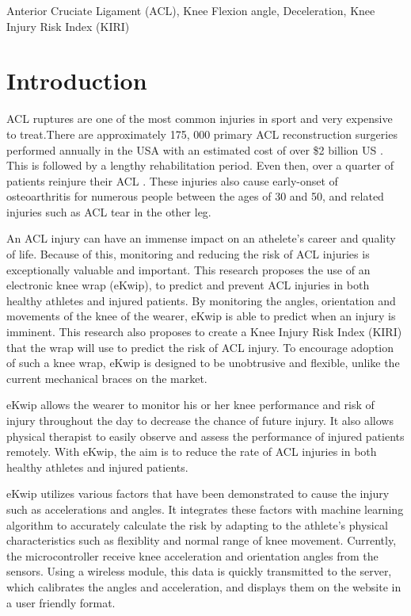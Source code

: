 \documentclass{sig-alternate}
\begin{document}
\begin{keywords}
	Anterior Cruciate Ligament (ACL),  Knee Flexion angle, Deceleration, Knee Injury Risk Index (KIRI)
\end{keywords}

\section{Introduction}
\label{sec:intro}
ACL ruptures are one of the most common injuries in sport and very expensive to treat.There are approximately 175, 000 primary ACL reconstruction surgeries performed annually in the USA with an estimated cost of over \$2 billion US \cite{yu2007mechanisms}. This is followed by a lengthy rehabilitation period. Even then, over a quarter of patients reinjure their ACL \cite{stevenson1998gender}. These injuries also cause early-onset of osteoarthritis for numerous people between the ages of 30 and 50, and related injuries such as ACL tear in the other leg. \cite{2d7e8810e30d11dd990c000ea68e967b}

An ACL injury can have an immense impact on an athelete's career and quality of life. Because of this, monitoring and reducing the risk of ACL injuries is exceptionally valuable and important. This research proposes the use of an electronic knee wrap (eKwip), to predict and prevent ACL injuries in both healthy athletes and injured patients. By monitoring the angles, orientation and movements of the knee of the wearer, eKwip is able to predict when an injury is imminent. This research also proposes to create a Knee Injury Risk Index (KIRI) that the wrap will use to predict the risk of ACL injury. To encourage adoption of such a knee wrap, eKwip is designed to be unobtrusive and flexible, unlike the current mechanical braces on the market.

eKwip allows the wearer to monitor his or her knee performance and risk of injury throughout the day to decrease the chance of future injury. It also allows physical therapist to easily observe and assess the performance of injured patients remotely. With eKwip, the aim is to reduce the rate of ACL injuries in both healthy athletes and injured patients.

eKwip utilizes various factors that have been demonstrated to cause the injury such as accelerations and angles. It integrates these factors with machine learning algorithm to accurately calculate the risk by adapting to the athlete's physical characteristics such as flexiblity and normal range of knee movement. Currently, the microcontroller receive knee acceleration and orientation angles from the sensors. Using a wireless module, this data is quickly transmitted to the server, which calibrates the angles and acceleration, and displays them on the website in a user friendly format.
\end{document}
